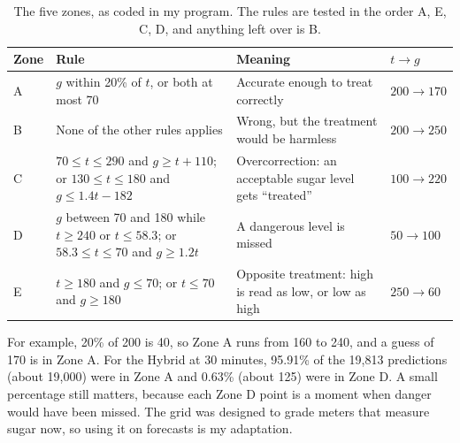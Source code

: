 \documentclass[11pt,a4paper]{article}
\begin{document}
\begin{table}[ht]
\centering
\small
\caption{The five zones, as coded in my program. The rules are tested in the order A, E, C, D, and anything left over is B.}
\label{tab:zones}
\begin{tabular}{@{}l>{\raggedright\arraybackslash}p{6.7cm}>{\raggedright\arraybackslash}p{4.9cm}l@{}}
\toprule
Zone & Rule & Meaning & $t \to g$\\
\midrule
A & $g$ within 20\% of $t$, or both at most 70 & Accurate enough to treat correctly & $200 \to 170$\\
B & None of the other rules applies & Wrong, but the treatment would be harmless & $200 \to 250$\\
C & $70 \le t \le 290$ and $g \ge t+110$; or $130 \le t \le 180$ and $g \le 1.4t-182$ & Overcorrection: an acceptable sugar level gets ``treated'' & $100 \to 220$\\
D & $g$ between 70 and 180 while $t \ge 240$ or $t \le 58.3$; or $58.3 \le t \le 70$ and $g \ge 1.2t$ & A dangerous level is missed & $50 \to 100$\\
E & $t \ge 180$ and $g \le 70$; or $t \le 70$ and $g \ge 180$ & Opposite treatment: high is read as low, or low as high & $250 \to 60$\\
\bottomrule
\end{tabular}
\end{table}

For example, 20\% of 200 is 40, so Zone A runs from 160 to 240, and a guess of 170 is in Zone A. For the Hybrid at 30 minutes, 95.91\% of the 19,813 predictions (about 19,000) were in Zone A and 0.63\% (about 125) were in Zone D. A small percentage still matters, because each Zone D point is a moment when danger would have been missed. The grid was designed to grade meters that measure sugar now, so using it on forecasts is my adaptation.
\end{document}
